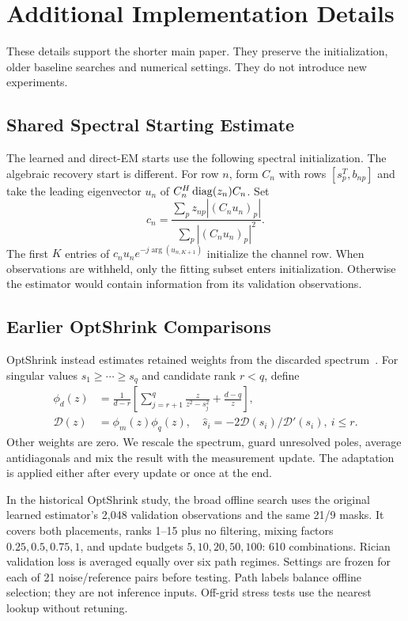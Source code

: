 \section{Additional Implementation Details}
These details support the shorter main paper. They preserve the initialization, older baseline searches and numerical settings. They do not introduce new experiments.

\subsection{Shared Spectral Starting Estimate}
The learned and direct-EM starts use the following spectral initialization. The algebraic recovery start is different. For row $n$, form $C_n$ with rows $[s_p^T,b_{np}]$ and take the leading eigenvector $u_n$ of $C_n^H\operatorname{diag}(z_n)C_n$. Set
\begin{equation}
 c_n=\frac{\sum_p z_{np}|(C_nu_n)_p|}{\sum_p|(C_nu_n)_p|^2}.
\end{equation}
The first $K$ entries of $c_nu_ne^{-j\arg(u_{n,K+1})}$ initialize the channel row. When observations are withheld, only the fitting subset enters initialization. Otherwise the estimator would contain information from its validation observations.


\subsection{Earlier OptShrink Comparisons}
OptShrink instead estimates retained weights from the discarded spectrum~\cite{nadakuditi2014}. For singular values $s_1\ge\cdots\ge s_q$ and candidate rank $r<q$, define
\begin{align}
 \phi_d(z)&=\frac{1}{d-r}\left[\sum_{j=r+1}^{q}\frac{z}{z^2-s_j^2}+\frac{d-q}{z}\right],\nonumber\\
 \mathcal D(z)&=\phi_m(z)\phi_q(z),\quad
 \widehat s_i=-2\mathcal D(s_i)/\mathcal D'(s_i),\ i\le r.
\end{align}
Other weights are zero. We rescale the spectrum, guard unresolved poles, average antidiagonals and mix the result with the measurement update. The adaptation is applied either after every update or once at the end.

In the historical OptShrink study, the broad offline search uses the original learned estimator's 2,048 validation observations and the same 21/9 masks. It covers both placements, ranks 1--15 plus no filtering, mixing factors $0.25,0.5,0.75,1$, and update budgets $5,10,20,50,100$: 610 combinations. Rician validation loss is averaged equally over six path regimes. Settings are frozen for each of 21 noise/reference pairs before testing. Path labels balance offline selection; they are not inference inputs. Off-grid stress tests use the nearest lookup without retuning.

